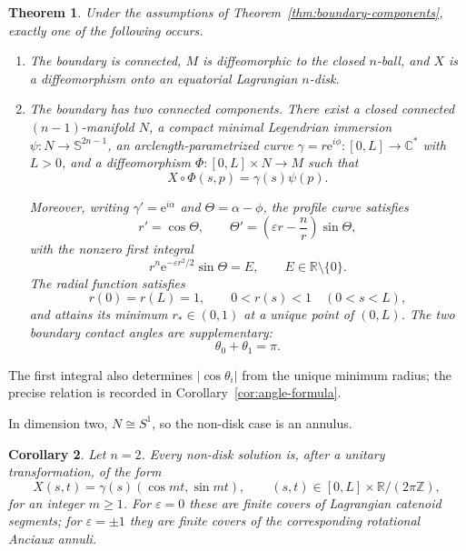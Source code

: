 \documentclass[11pt,a4paper]{article}
\numberwithin{equation}{section}
\newtheorem{theorem}{Theorem}[section]
\newtheorem{corollary}[theorem]{Corollary}
\newcommand{\C}{\mathbb C}
\newcommand{\R}{\mathbb R}
\newcommand{\Sph}{\mathbb S}
\newcommand{\ee}{\mathrm e}
\begin{document}
\begin{theorem}\label{thm:classification}
Under the assumptions of Theorem~\ref{thm:boundary-components}, exactly one of the following occurs.

\begin{enumerate}[label=\rm(\roman*)]
\item The boundary is connected, $M$ is diffeomorphic to the closed
$n$-ball, and $X$ is a diffeomorphism onto an equatorial Lagrangian $n$-disk.

\item The boundary has two connected components.  There exist a closed
connected $(n-1)$-manifold $N$, a compact minimal Legendrian immersion
$\psi:N\to\Sph^{2n-1}$, an arclength-parametrized curve
$\gamma=r\ee^{i\phi}:[0,L]\to\C^*$ with $L>0$, and a diffeomorphism
$\Phi:[0,L]\times N\to M$ such that
\begin{equation}
        X\circ\Phi(s,p)=\gamma(s)\psi(p).
\end{equation}

Moreover, writing $\gamma'=\ee^{i\alpha}$ and
$\Theta=\alpha-\phi$, the profile curve satisfies
\begin{equation}\label{eq:intro-anciaux-system}
        r'=\cos\Theta,
        \qquad
        \Theta'=\left(\varepsilon r-\frac nr\right)\sin\Theta,
\end{equation}
with the nonzero first integral
\begin{equation}
        r^n\ee^{-\varepsilon r^2/2}\sin\Theta=E,
        \qquad E\in\mathbb R\setminus\{0\}.
\end{equation}
The radial function satisfies
\begin{equation}
        r(0)=r(L)=1,
        \qquad
        0<r(s)<1\quad(0<s<L),
\end{equation}
and attains its minimum $r_*\in(0,1)$ at a unique point of $(0,L)$.
The two boundary contact angles are supplementary:
\begin{equation}
        \theta_0+\theta_1=\pi.
\end{equation}
\end{enumerate}
\end{theorem}

The first integral also determines $|\cos\theta_i|$ from the unique
minimum radius; the precise relation is recorded in
Corollary~\ref{cor:angle-formula}.

In dimension two, $N\cong S^1$, so the non-disk case is an annulus.

\begin{corollary}
\label{cor:two-dimensional}
Let $n=2$.  Every non-disk solution is, after a unitary transformation, of
the form
\begin{equation}\label{eq:intro-two-dimensional}
        X(s,t)=\gamma(s)(\cos mt,\sin mt),
        \qquad
        (s,t)\in[0,L]\times\R/(2\pi\mathbb Z),
\end{equation}
for an integer $m\ge1$.  For $\varepsilon=0$ these are finite covers of
Lagrangian catenoid segments; for $\varepsilon=\pm1$ they are finite covers of
the corresponding rotational Anciaux annuli.
\end{corollary}
\end{document}
